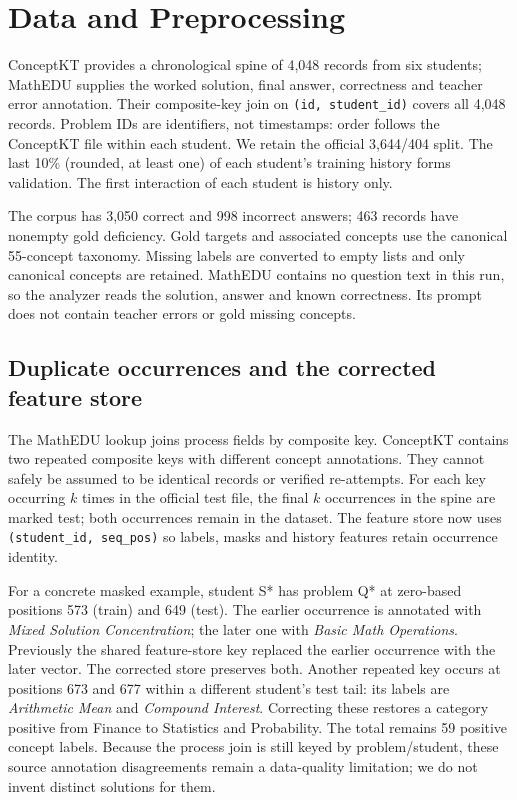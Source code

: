 \documentclass[11pt]{article}
\newcommand{\code}[1]{\texttt{\small #1}}
\begin{document}
\section{Data and Preprocessing}
ConceptKT provides a chronological spine of 4,048 records from six students; MathEDU supplies the worked solution, final answer, correctness and teacher error annotation. Their composite-key join on \code{(id, student\_id)} covers all 4,048 records. Problem IDs are identifiers, not timestamps: order follows the ConceptKT file within each student. We retain the official 3,644/404 split. The last 10\% (rounded, at least one) of each student's training history forms validation. The first interaction of each student is history only.

The corpus has 3,050 correct and 998 incorrect answers; 463 records have nonempty gold deficiency. Gold targets and associated concepts use the canonical 55-concept taxonomy. Missing labels are converted to empty lists and only canonical concepts are retained. MathEDU contains no question text in this run, so the analyzer reads the solution, answer and known correctness. Its prompt does not contain teacher errors or gold missing concepts.

\subsection{Duplicate occurrences and the corrected feature store}
The MathEDU lookup joins process fields by composite key. ConceptKT contains two repeated composite keys with different concept annotations. They cannot safely be assumed to be identical records or verified re-attempts. For each key occurring $k$ times in the official test file, the final $k$ occurrences in the spine are marked test; both occurrences remain in the dataset. The feature store now uses \code{(student\_id, seq\_pos)} so labels, masks and history features retain occurrence identity.

For a concrete masked example, student S* has problem Q* at zero-based positions 573 (train) and 649 (test). The earlier occurrence is annotated with \emph{Mixed Solution Concentration}; the later one with \emph{Basic Math Operations}. Previously the shared feature-store key replaced the earlier occurrence with the later vector. The corrected store preserves both. Another repeated key occurs at positions 673 and 677 within a different student's test tail: its labels are \emph{Arithmetic Mean} and \emph{Compound Interest}. Correcting these restores a category positive from Finance to Statistics and Probability. The total remains 59 positive concept labels. Because the process join is still keyed by problem/student, these source annotation disagreements remain a data-quality limitation; we do not invent distinct solutions for them.
\end{document}
